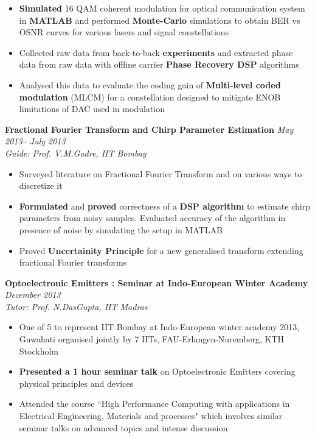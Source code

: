 \documentclass[a4paper,10pt]{article}
\newcommand{\ressubheadingWithGuide}[3]{%

	\textbf{#1} \hfill \textit{#2}\null\\
	\textit{\small #3} %
	\vspace{-4pt}
}
\begin{document}
            	\begin{itemize}\itemsep -1pt
              		 \item \textbf{Simulated} 16 QAM coherent modulation for optical communication system in \textbf{MATLAB} and performed \textbf{Monte-Carlo} simulations to obtain BER vs OSNR curves for various lasers and signal constellations
					\item Collected raw data from back-to-back \textbf{experiments} and extracted phase data from raw data with offline carrier \textbf{Phase Recovery DSP} algorithms
					\item Analysed this data to evaluate the coding gain of \textbf{Multi-level coded modulation} (MLCM) for a constellation designed to mitigate ENOB limitations of DAC used in modulation
	    		\end{itemize}

        	\ressubheadingWithGuide{Fractional Fourier Transform and Chirp Parameter Estimation}{\textit{May 2013-- July 2013}}{Guide: Prof. V.M.Gadre, IIT Bombay}
            	\begin{itemize}\itemsep -1pt
            	\item Surveyed literature on Fractional Fourier Transform and on various ways to discretize it
                \item \textbf{Formulated} and \textbf{proved} correctness of a \textbf{DSP algorithm} to estimate chirp parameters from noisy samples. Evaluated accuracy of the algorithm in presence of noise by simulating the setup in MATLAB
				\item Proved \textbf{Uncertainity Principle} for a new generalised transform extending fractional Fourier transforms
				\end{itemize}
				
        	\ressubheadingWithGuide{Optoelectronic Emitters : Seminar at Indo-European Winter Academy}{\textit{December 2013}}{Tutor: Prof. N.DasGupta, IIT Madras}
            	\begin{itemize}\itemsep -1pt
					\item One of 5 to represent IIT Bombay at Indo-European winter academy 2013, Guwahati organised jointly by 7 IITs, FAU-Erlangen-Nuremberg, KTH Stockholm
					\item \textbf{Presented a 1 hour seminar talk} on Optoelectronic Emitters covering physical principles and devices
					\item Attended the course ``High Performance Computing with applications in Electrical Engineering, Materials and processes" which involves similar seminar talks on advanced topics and intense discussion
				\end{itemize}
	
\end{document}
